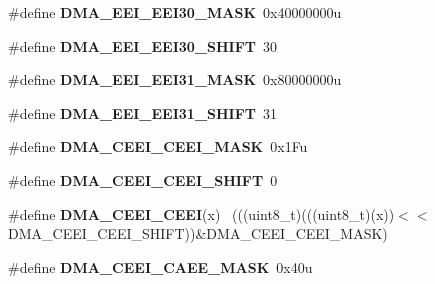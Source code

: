 \begin{DoxyCompactItemize}
\item 
\hypertarget{group___d_m_a___register___masks_ga7c8268008b1e3486a4f0c50fa318bf3e}{}\#define {\bfseries D\+M\+A\+\_\+\+E\+E\+I\+\_\+\+E\+E\+I30\+\_\+\+M\+A\+S\+K}~0x40000000u\label{group___d_m_a___register___masks_ga7c8268008b1e3486a4f0c50fa318bf3e}

\item 
\hypertarget{group___d_m_a___register___masks_gac620caab75de2ca9e93c3b50db64e2bd}{}\#define {\bfseries D\+M\+A\+\_\+\+E\+E\+I\+\_\+\+E\+E\+I30\+\_\+\+S\+H\+I\+F\+T}~30\label{group___d_m_a___register___masks_gac620caab75de2ca9e93c3b50db64e2bd}

\item 
\hypertarget{group___d_m_a___register___masks_ga0853ae4220419319f94c83554f0104da}{}\#define {\bfseries D\+M\+A\+\_\+\+E\+E\+I\+\_\+\+E\+E\+I31\+\_\+\+M\+A\+S\+K}~0x80000000u\label{group___d_m_a___register___masks_ga0853ae4220419319f94c83554f0104da}

\item 
\hypertarget{group___d_m_a___register___masks_ga5d84c6aaa396f2073a5949f10e8e4736}{}\#define {\bfseries D\+M\+A\+\_\+\+E\+E\+I\+\_\+\+E\+E\+I31\+\_\+\+S\+H\+I\+F\+T}~31\label{group___d_m_a___register___masks_ga5d84c6aaa396f2073a5949f10e8e4736}

\item 
\hypertarget{group___d_m_a___register___masks_gaac1e3fb6ff551f58fe6c43c5b10a6186}{}\#define {\bfseries D\+M\+A\+\_\+\+C\+E\+E\+I\+\_\+\+C\+E\+E\+I\+\_\+\+M\+A\+S\+K}~0x1\+Fu\label{group___d_m_a___register___masks_gaac1e3fb6ff551f58fe6c43c5b10a6186}

\item 
\hypertarget{group___d_m_a___register___masks_ga66ffe3efeb446f55654d3ac90abf1cb6}{}\#define {\bfseries D\+M\+A\+\_\+\+C\+E\+E\+I\+\_\+\+C\+E\+E\+I\+\_\+\+S\+H\+I\+F\+T}~0\label{group___d_m_a___register___masks_ga66ffe3efeb446f55654d3ac90abf1cb6}

\item 
\hypertarget{group___d_m_a___register___masks_ga2d8d4e4120dfe61fdc0822333db37599}{}\#define {\bfseries D\+M\+A\+\_\+\+C\+E\+E\+I\+\_\+\+C\+E\+E\+I}(x)                                              ~(((uint8\+\_\+t)(((uint8\+\_\+t)(x))$<$$<$D\+M\+A\+\_\+\+C\+E\+E\+I\+\_\+\+C\+E\+E\+I\+\_\+\+S\+H\+I\+F\+T))\&D\+M\+A\+\_\+\+C\+E\+E\+I\+\_\+\+C\+E\+E\+I\+\_\+\+M\+A\+S\+K)\label{group___d_m_a___register___masks_ga2d8d4e4120dfe61fdc0822333db37599}

\item 
\hypertarget{group___d_m_a___register___masks_ga386c3018389f0adce8b163c90bc171b7}{}\#define {\bfseries D\+M\+A\+\_\+\+C\+E\+E\+I\+\_\+\+C\+A\+E\+E\+\_\+\+M\+A\+S\+K}~0x40u\label{group___d_m_a___register___masks_ga386c3018389f0adce8b163c90bc171b7}


\end{DoxyCompactItemize}
